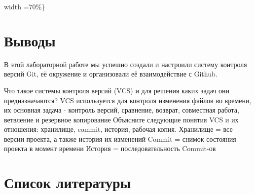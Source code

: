 \documentclass[
  english,
  russian,
  12pt,
  a4paper,
  DIV=11,
  numbers=noendperiod]{scrreprt}
\begin{document}
width =70\%\}

\chapter{Выводы}\label{ux432ux44bux432ux43eux434ux44b}

В этой лабораторной работе мы успешно создали и настроили систему
контроля версий Git, её окружение и организовали её взаимодействие с
Github.

Что такое системы контроля версий (VCS) и для решения каких задач они
предназначаются? VCS используется для контроля изменения файлов во
времени, их основная задача - контроль версий, сравнение, возврат,
совместная работа, ветвление и резервное копирование Объясните следующие
понятия VCS и их отношения: хранилище, commit, история, рабочая копия.
Хранилище = все версии проекта, а также история их изменений Commit =
снимок состояния проекта в момент времени История = последовательность
Commit-ов

\chapter*{Список
литературы}\label{ux441ux43fux438ux441ux43eux43a-ux43bux438ux442ux435ux440ux430ux442ux443ux440ux44b}

\printbibliography[heading=none]
\end{document}
